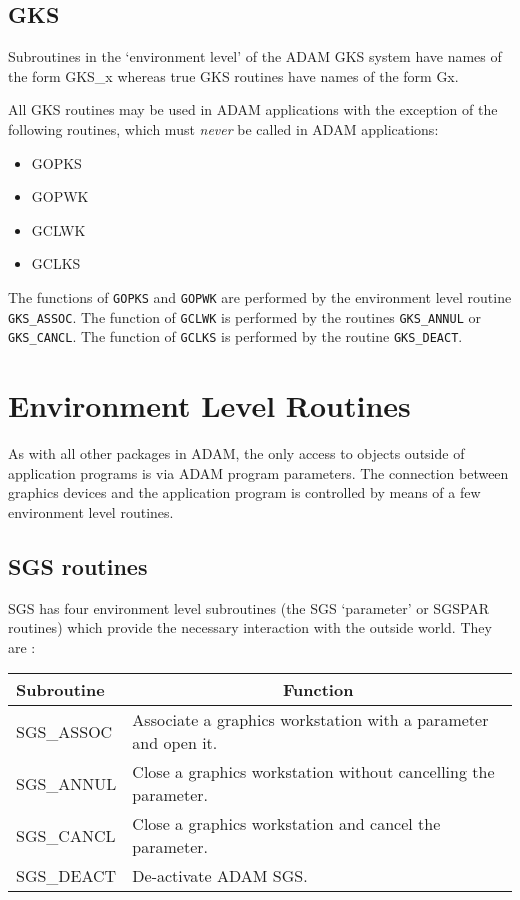 \subsection{GKS}

Subroutines in the `environment level' of the ADAM GKS system have names of
the form GKS\_x whereas true GKS routines have names of the form Gx.

All GKS routines may be used in ADAM applications with the exception of the
following routines, which must {\em never} be called in ADAM applications:

\begin{itemize}
\item GOPKS
\item GOPWK
\item GCLWK
\item GCLKS
\end{itemize}

The functions of {\tt GOPKS} and {\tt GOPWK} are performed by the environment 
level routine {\tt GKS\_ASSOC}. The function of {\tt GCLWK} is performed by 
the routines {\tt GKS\_ANNUL} or {\tt GKS\_CANCL}. The function of {\tt GCLKS} 
is performed by the routine {\tt GKS\_DEACT}.

\section{Environment Level Routines}

As with all other packages in ADAM, the only access to objects outside of
application programs is via ADAM program parameters. The connection between
graphics devices and the application program is controlled by means of a few
environment level routines.

\subsection{SGS routines}

SGS has four environment level subroutines (the SGS `parameter' or SGSPAR 
routines) which provide the necessary interaction with the outside world.
They are :

\begin{center}
\begin{tabular}{||l|l||} \hline
Subroutine & \multicolumn{1}{c||}{Function} \\ \hline
SGS\_ASSOC  & Associate a graphics workstation with a parameter and open it.\\
SGS\_ANNUL  & Close a graphics workstation without cancelling the parameter.\\
SGS\_CANCL  & Close a graphics workstation and cancel the parameter.\\
SGS\_DEACT  & De-activate ADAM SGS.\\ \hline
\end{tabular}
\end{center}

